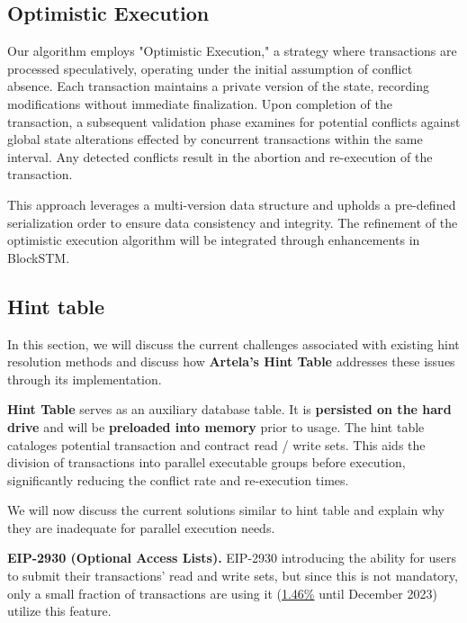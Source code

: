 \subsection{Optimistic Execution}

Our algorithm employs "Optimistic Execution," a strategy where transactions are processed speculatively, operating under the initial assumption of conflict absence. Each transaction maintains a private version of the state, recording modifications without immediate finalization. Upon completion of the transaction, a subsequent validation phase examines for potential conflicts against global state alterations effected by concurrent transactions within the same interval. Any detected conflicts result in the abortion and re-execution of the transaction. 

This approach leverages a multi-version data structure and upholds a pre-defined serialization order to ensure data consistency and integrity. The refinement of the optimistic execution algorithm will be integrated through enhancements in BlockSTM.

\subsection{Hint table}

In this section, we will discuss the current challenges associated with existing hint resolution methods and discuss how \textbf{Artela's Hint Table} addresses these issues through its implementation.

\textbf{Hint Table} serves as an auxiliary database table. It is \textbf{persisted on the hard drive} and will be \textbf{preloaded into memory} prior to usage. The hint table cataloges potential transaction and contract read / write sets. This aids the division of transactions into parallel executable groups before execution, significantly reducing the conflict rate and re-execution times.

We will now discuss the current solutions similar to hint table and explain why they are inadequate for parallel execution needs.

\textbf{EIP-2930 (Optional Access Lists).} EIP-2930 introducing the ability for users to submit their transactions' read and write sets, but since this is not mandatory, only a small fraction of transactions are using it (\href{https://arxiv.org/html/2312.06574v1#:~:text=Analyzing%20a%20full%20month%20of,%24%205%20Mio)%20per%20year.}{1.46\%} until December 2023) utilize this feature.

